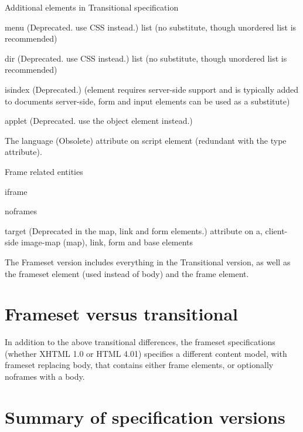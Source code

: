 \begin{compactitem}
\item Additional elements in Transitional specification
	
	\begin{compactitem}
	\item menu (Deprecated. use CSS instead.) list (no substitute, though unordered list is recommended)
	\item dir (Deprecated. use CSS instead.) list (no substitute, though unordered list is recommended)
	\item isindex (Deprecated.) (element requires server-side support and is typically added to documents server-side, form and input elements can be used as a substitute)
	\item applet (Deprecated. use the object element instead.)
	\end{compactitem}

\item The language (Obsolete) attribute on script element (redundant with the type attribute).
\item Frame related entities
	\begin{compactitem}
	\item iframe
	\item noframes
	\item target (Deprecated in the map, link and form elements.) attribute on a, client-side image-map (map), link, form and base elements
	\end{compactitem}
	
\end{compactitem}

The Frameset version includes everything in the Transitional version, as well as the frameset element (used instead of body) and the frame element.



\section{Frameset versus transitional}

In addition to the above transitional differences, the frameset specifications (whether XHTML 1.0 or HTML 4.01) specifies a different content model, with frameset replacing body, that contains either frame elements, or optionally noframes with a body.



\section{Summary of specification versions}

